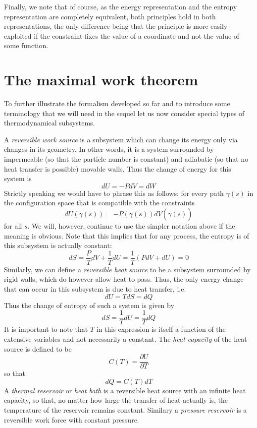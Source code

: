 \documentclass[a4paper, draft]{article}
\theoremstyle{own}
\theoremstyle{remark}
\begin{document}
Finally, we note that of course, as the energy representation and the entropy representation are completely equivalent, both principles hold in both representations, the only difference being that the principle is more easily exploited if the constraint fixes the value of a coordinate and not the value of some function.


\section{The maximal work theorem}

To further illustrate the formalism developed so far and to introduce some terminology that we will need in the sequel let us now consider special types of thermodynamical subsystems. 

A {\em reversible work source} is a subsystem which can change its energy only via changes in its geometry. In other words, it is a system surrounded by impermeable (so that the particle number is constant) and adiabatic (so that no heat transfer is possible) movable walls. Thus the change of energy for this system is
$$
dU = - P dV = dW
$$
Strictly speaking we would have to phrase this as follows: for every path $\gamma(s)$ in the configuration space that is compatible with the constraints
$$
dU(\gamma(s)) = - P(\gamma(s)) dV(\dot{\gamma(s)})
$$
for all $s$. We will, however, continue to use the simpler notation above if the meaning is obvious. Note that this implies that for any process, the entropy is of this subsystem is actually constant:
$$
dS = \frac{P}{T} dV + \frac{1}{T} dU = \frac{1}{T} (P dV + dU) = 0
$$
Similarly, we can define a {\em reversible heat source} to be a subsystem surrounded by rigid walls, which do however allow heat to pass. Thus, the only energy change that can occur in this subsystem is due to heat transfer, i.e.
$$
dU = T dS = dQ
$$
Thus the change of entropy of such a system is given by
$$
dS = \frac{1}{T} dU = \frac{1}{T} dQ
$$
It is important to note that $T$ in this expression is itself a function of the extensive variables and not necessarily a constant. The {\em heat capacity} of the heat source is defined to be
$$
C(T) = \frac{\partial U}{\partial T}
$$
so that
$$
dQ = C(T) dT
$$
A {\em thermal reservoir} or {\em heat bath} is a reversible heat source with an infinite heat capacity, so that, no matter how large the transfer of heat actually is, the temperature of the reservoir remains constant. Similary a {\em pressure reservoir} is a reversible work force with constant pressure. 
\end{document}
